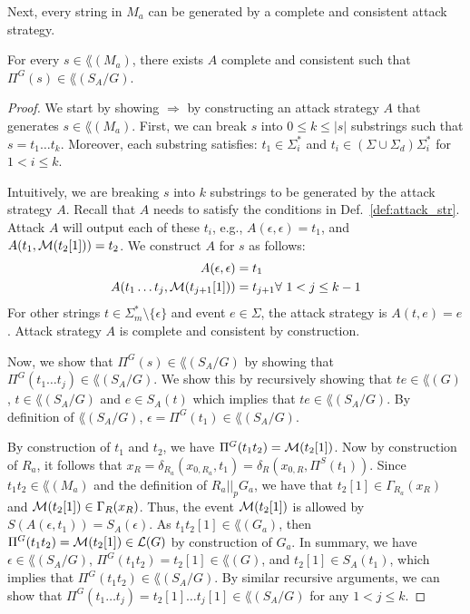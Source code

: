Next, every string in $M_a$ can be generated by a complete and consistent attack strategy.
\begin{proposition}\label{prop:Ma-Sa}
For every $s\in \lang(M_a)$, there exists $A$ complete and consistent such that $\Pi^G(s)\in \lang(S_A/G)$.
\end{proposition}
\begin{proof}
We start by showing $\Rightarrow$ by constructing an attack strategy $A$ that generates $s\in \lang(M_a)$.
First, we can break $s$ into $0\leq k\leq|s|$ substrings such that $s = t_1\dots t_k$.
Moreover, each substring satisfies: $t_1\in \Sigma_i^*$ and $t_i\in (\Sigma\cup\Sigma_d)\Sigma_i^*$ for $1<i\leq k$.

Intuitively, we are breaking $s$ into $k$ substrings to be generated by the attack strategy $A$.
Recall that $A$ needs to satisfy the conditions in Def.~\ref{def:attack_str}.
Attack $A$ will output each of these $t_i$, e.g., $A(\epsilon,\epsilon) = t_1$, and $A(t_1,\mathcal{M}(t_2[1])) = t_2$.
We construct $A$ for $s$ as follows:
\begin{align*}
A(\epsilon,\epsilon) &= t_1\\
A(t_1\dots t_j,\mathcal{M}(t_{j+1}[1])) &= t_{j+1} \forall\ 1<j\leq k-1
\end{align*}
For other strings $t\in\Sigma_m^*\setminus\{\epsilon\}$ and event $e\in\Sigma$, the attack strategy is $A(t,e)=e$.
Attack strategy $A$ is complete and consistent by construction.

Now, we show that $\Pi^G(s)\in \lang(S_A/G)$ by showing that $\Pi^G(t_1\dots t_j)\in \lang(S_A/G)$.
We show this by recursively showing that $te\in \lang(G)$, $t\in \lang(S_A/G)$ and $e\in S_A(t)$ which implies that $te\in \lang(S_A/G)$.  
By definition of $\lang(S_A/G)$, $\epsilon = \Pi^G(t_1)\in \lang(S_A/G)$.

By construction of $t_1$ and $t_2$, we have $\Pi^G(t_1t_2) = \mathcal{M}(t_2[1])$.
Now by construction of $R_a$, it follows that $x_R = \delta_{R_a}(x_{0,R_a},t_1) = \delta_R(x_{0,R},\Pi^S(t_1))$. 
Since $t_1t_2 \in \lang(M_a)$ and the definition of $R_a||_pG_a$, we have that $t_2[1]\in \Gamma_{R_a}(x_R)$ and $\mathcal{M}(t_2[1])\in \Gamma_{R}(x_R)$.
Thus, the event $\mathcal{M}(t_2[1])$ is allowed by $S(A(\epsilon,t_1)) = S_A(\epsilon)$.
As $t_1t_2[1]\in \lang(G_a)$, then $\Pi^G(t_1t_2) = \mathcal{M}(t_2[1])\in \mathcal{L}(G)$ by construction of $G_a$.
In summary, we have $\epsilon\in \lang(S_A/G)$, $\Pi^G(t_1t_2) = t_2[1]\in \lang(G)$, and $t_2[1]\in S_A(t_1)$, which implies that $\Pi^G(t_1t_2)\in \lang(S_A/G)$.
By similar recursive arguments, we can show that $\Pi^G(t_1\dots t_j) = t_2[1]\dots t_j[1]\in \lang(S_A/G)$ for any $1<j\leq k$.
\end{proof}


